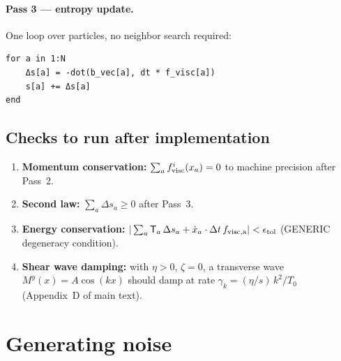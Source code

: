 \documentclass[12pt,aps,preprint,nofootinbib,noshowkeys,noshowpacs,longbibliography,superscriptaddress,tightenlines]{revtex4-2}
\def\Teff{{\sf T}}
\begin{document}
\paragraph{Pass 3 — entropy update.}
One loop over particles, no neighbor search required:
\begin{lstlisting}
for a in 1:N
    Δs[a] = -dot(b_vec[a], dt * f_visc[a])
    s[a] += Δs[a]
end
\end{lstlisting}

\subsection*{Checks to run after implementation}

\begin{enumerate}
    \item \textbf{Momentum conservation:} $\sum_a f^i_{\rm visc}(x_a) = 0$
          to machine precision after Pass~2.
    \item \textbf{Second law:} $\sum_a \Delta s_a \geq 0$ after Pass~3.
    \item \textbf{Energy conservation:} $|\sum_a \Teff_a\,\Delta s_a
          + \dot x_a \cdot \Delta t\, f_{\rm visc,a}| < \epsilon_{\rm tol}$
          (GENERIC degeneracy condition).
    \item \textbf{Shear wave damping:} with $\eta > 0$, $\zeta = 0$,
          a transverse wave $M^y(x) = A\cos(kx)$ should damp at rate
          $\gamma_k = (\eta/s)\,k^2/T_0$ (Appendix~D of main text).
\end{enumerate}


\section{Generating noise}
\end{document}
